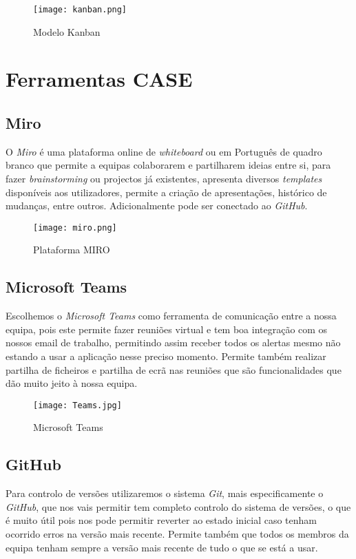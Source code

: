 \documentclass[a4paper]{article}
\begin{document}
\begin{figure}[H]
    \centering
    \texttt{[image: kanban.png]}
    \caption{Modelo Kanban\texttrademark}
    \label{fig:kanban}
\end{figure}

\section{Ferramentas CASE}
\subsection{Miro}
O \textit{Miro} é uma plataforma online de \textit{whiteboard} ou em Português de quadro branco que permite a equipas colaborarem e partilharem ideias entre si, para fazer 
\textit{brainstorming} ou projectos já existentes, apresenta diversos \textit{templates} disponíveis aos utilizadores, permite a criação de apresentações, histórico de mudanças, entre outros. Adicionalmente pode ser conectado ao \textit{GitHub}.

\begin{figure}[H]
    \centering
    \texttt{[image: miro.png]}
    \caption{Plataforma MIRO\texttrademark}
    \label{fig:miro}
\end{figure}

\subsection{Microsoft Teams}
Escolhemos o \textit{Microsoft Teams} como ferramenta de comunicação entre a nossa equipa, pois este permite fazer reuniões virtual e tem boa integração com os nossos email de trabalho, permitindo assim receber todos os alertas mesmo não estando a usar a aplicação nesse preciso momento.
Permite também realizar partilha de ficheiros e partilha de ecrã nas reuniões que são funcionalidades que dão muito jeito à nossa equipa.

\begin{figure}[H]
    \centering
    \texttt{[image: Teams.jpg]}
    \caption{Microsoft Teams\texttrademark}
    \label{fig:teams}
\end{figure}

\subsection{GitHub}
Para controlo de versões utilizaremos o sistema \textit{Git}, mais especificamente o \textit{GitHub}, que nos vais permitir tem completo controlo do sistema de versões, o que é muito útil pois nos pode permitir reverter ao estado inicial caso tenham ocorrido erros na versão mais recente.
Permite também que todos os membros da equipa tenham sempre a versão mais recente de tudo o que se está a usar.
\end{document}
